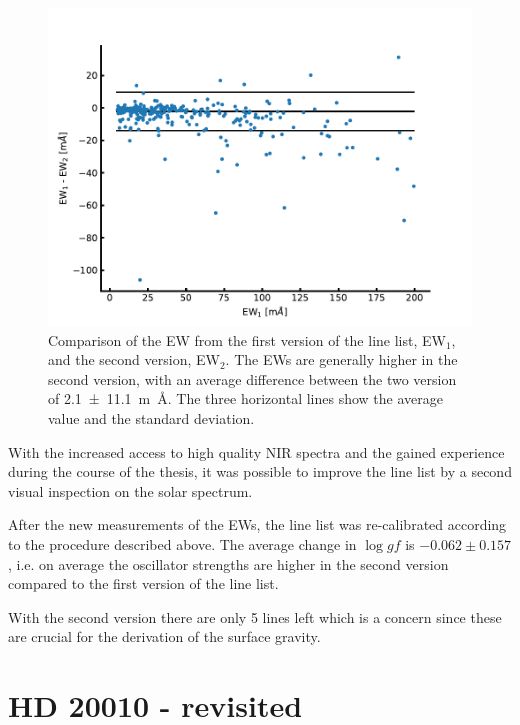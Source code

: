 \begin{figure}[htpb!]
    \centering
    \includegraphics[width=1.0\linewidth]{figures/linelist_comparison.pdf}
    \caption{Comparison of the EW from the first version of the line list, EW$_1$, and the second
             version, EW$_2$. The EWs are generally higher in the second version, with an average
             difference between the two version of \SI{2.1+-11.1}{m\angstrom}. The three horizontal
             lines show the average value and the standard deviation.}
    \label{fig:linelist_comparison}
\end{figure}

With the increased access to high quality NIR spectra and the gained experience during the course
of the thesis, it was possible to improve the line list by a second visual inspection on the solar
spectrum.

After the new measurements of the EWs, the line list was re-calibrated according to the procedure
described above. The average change in $\log \mathit{gf}$ is $-0.062\pm0.157$, i.e. on average the
oscillator strengths are higher in the second version compared to the first version of the line
list.

With the second version there are only 5  lines left which is a concern since these are
crucial for the derivation of the surface gravity.




\section{HD 20010 - revisited}
\label{sec:HD20010_second}


